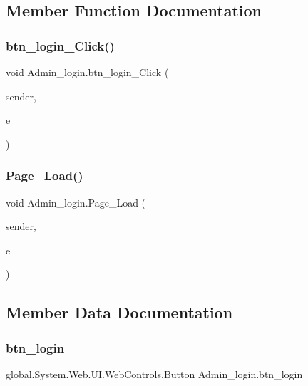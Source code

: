 \subsection{Member Function Documentation}
\mbox{\label{class_admin__login_a2fdd70d2b33f4c8a85faebbe31f25147}} 
\subsubsection{\texorpdfstring{btn\_login\_Click()}{btn\_login\_Click()}}
{\footnotesize\ttfamily void Admin\+\_\+login.\+btn\+\_\+login\+\_\+\+Click (\begin{DoxyParamCaption}\item[{object}]{sender,  }\item[{Event\+Args}]{e }\end{DoxyParamCaption})\hspace{0.3cm}{\ttfamily [protected]}}

\mbox{\label{class_admin__login_ac7ea79ef6799726f0c6dc5bfda4847dd}} 
\subsubsection{\texorpdfstring{Page\_Load()}{Page\_Load()}}
{\footnotesize\ttfamily void Admin\+\_\+login.\+Page\+\_\+\+Load (\begin{DoxyParamCaption}\item[{object}]{sender,  }\item[{Event\+Args}]{e }\end{DoxyParamCaption})\hspace{0.3cm}{\ttfamily [protected]}}



\subsection{Member Data Documentation}
\mbox{\label{class_admin__login_a8c186b94aacef68548f1149242e2bf99}} 
\subsubsection{\texorpdfstring{btn\_login}{btn\_login}}
{\footnotesize\ttfamily global.\+System.\+Web.\+U\+I.\+Web\+Controls.\+Button Admin\+\_\+login.\+btn\+\_\+login\hspace{0.3cm}{\ttfamily [protected]}}




